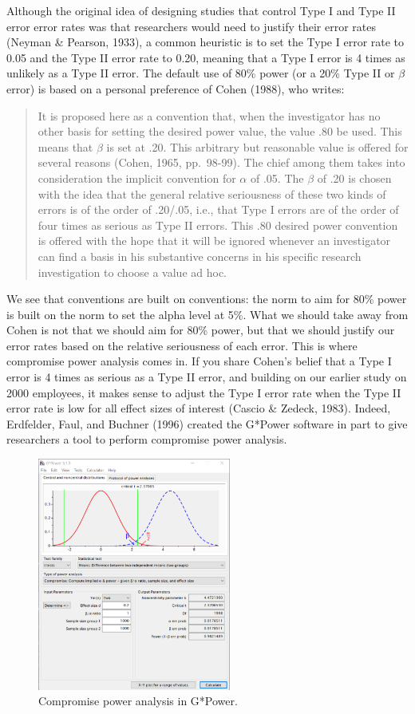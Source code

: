 \documentclass[
  english,
  ,jou,floatsintext]{apa6}
\begin{document}
Although the original idea of designing studies that control Type I and Type II error error rates was that researchers would need to justify their error rates (Neyman \& Pearson, 1933), a common heuristic is to set the Type I error rate to 0.05 and the Type II error rate to 0.20, meaning that a Type I error is 4 times as unlikely as a Type II error. The default use of 80\% power (or a 20\% Type II or \(\beta\) error) is based on a personal preference of Cohen (1988), who writes:

\begin{quote}
It is proposed here as a convention that, when the investigator has no other basis for setting the desired power value, the value .80 be used. This means that \(\beta\) is set at .20. This arbitrary but reasonable value is offered for several reasons (Cohen, 1965, pp.~98-99). The chief among them takes into consideration the implicit convention for \(\alpha\) of .05. The \(\beta\) of .20 is chosen with the idea that the general relative seriousness of these two kinds of errors is of the order of .20/.05, i.e., that Type I errors are of the order of four times as serious as Type II errors. This .80 desired power convention is offered with the hope that it will be ignored whenever an investigator can find a basis in his substantive concerns in his specific research investigation to choose a value ad hoc.
\end{quote}

We see that conventions are built on conventions: the norm to aim for 80\% power is built on the norm to set the alpha level at 5\%. What we should take away from Cohen is not that we should aim for 80\% power, but that we should justify our error rates based on the relative seriousness of each error. This is where compromise power analysis comes in. If you share Cohen's belief that a Type I error is 4 times as serious as a Type II error, and building on our earlier study on 2000 employees, it makes sense to adjust the Type I error rate when the Type II error rate is low for all effect sizes of interest (Cascio \& Zedeck, 1983). Indeed, Erdfelder, Faul, and Buchner (1996) created the G*Power software in part to give researchers a tool to perform compromise power analysis.

\begin{figure}
\includegraphics[width=240px]{images/compromise1} \caption{Compromise power analysis in G*Power.}\label{fig:gpowcompromise}
\end{figure}
\end{document}
